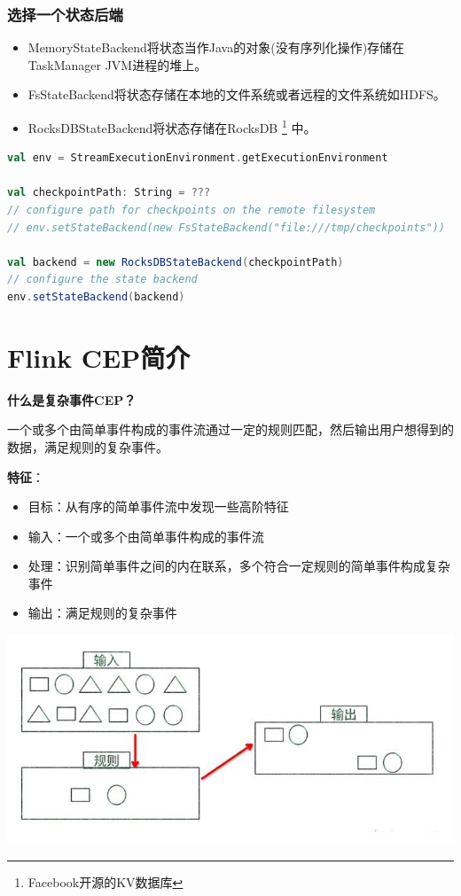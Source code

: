 \documentclass[oneside]{ctexbook}
\begin{document}
\subsection{选择一个状态后端}

\begin{itemize}
\item MemoryStateBackend将状态当作Java的对象(没有序列化操作)存储在TaskManager JVM进程的堆上。
\item FsStateBackend将状态存储在本地的文件系统或者远程的文件系统如HDFS。
\item RocksDBStateBackend将状态存储在RocksDB \footnote{Facebook开源的KV数据库} 中。
\end{itemize}

\begin{lstlisting}[language=scala]
val env = StreamExecutionEnvironment.getExecutionEnvironment

val checkpointPath: String = ???
// configure path for checkpoints on the remote filesystem
// env.setStateBackend(new FsStateBackend("file:///tmp/checkpoints"))

val backend = new RocksDBStateBackend(checkpointPath)
// configure the state backend
env.setStateBackend(backend)
\end{lstlisting}



\chapter{Flink CEP简介}

\textbf{什么是复杂事件CEP？}

一个或多个由简单事件构成的事件流通过一定的规则匹配，然后输出用户想得到的数据，满足规则的复杂事件。

\textbf{特征}：

\begin{itemize}
\item 目标：从有序的简单事件流中发现一些高阶特征
\item 输入：一个或多个由简单事件构成的事件流
\item 处理：识别简单事件之间的内在联系，多个符合一定规则的简单事件构成复杂事件
\item 输出：满足规则的复杂事件
\end{itemize}

\noindent \includegraphics[width=\textwidth]{cep1.jpg}
\end{document}

